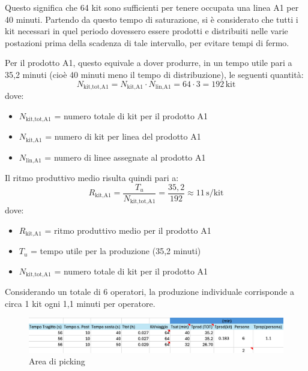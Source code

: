 \documentclass[11pt]{article}
\begin{document}
\noindent
Questo significa che 64 kit sono sufficienti per tenere occupata una linea A1 per 40 minuti. Partendo da questo tempo di saturazione, si è considerato che tutti i kit necessari in quel periodo dovessero essere prodotti e distribuiti nelle varie postazioni prima della scadenza di tale intervallo, per evitare tempi di fermo.

Per il prodotto A1, questo equivale a dover produrre, in un tempo utile pari a 35,2 minuti (cioè 40 minuti meno il tempo di distribuzione), le seguenti quantità:
\begin{equation}
    N_\text{kit,tot,A1} = N_\text{kit,A1} \cdot N_\text{lin,A1} = 64 \cdot 3 = 192 \, \text{kit}
\end{equation}
dove:
\begin{itemize}
    \item $N_\text{kit,tot,A1}$ = numero totale di kit per il prodotto A1
    \item $N_\text{kit,A1}$ = numero di kit per linea del prodotto A1
    \item $N_\text{lin,A1}$ = numero di linee assegnate al prodotto A1
\end{itemize}

\noindent
Il ritmo produttivo medio risulta quindi pari a:
\begin{equation}
    R_\text{kit,A1} = \frac{T_u}{N_\text{kit,tot,A1}} = \frac{35{,}2}{192} \approx 11 \, \text{s/kit}
\end{equation}
dove:
\begin{itemize}
    \item $R_\text{kit,A1}$ = ritmo produttivo medio per il prodotto A1
    \item $T_u$ = tempo utile per la produzione (35,2 minuti)
    \item $N_\text{kit,tot,A1}$ = numero totale di kit per il prodotto A1
\end{itemize}

Considerando un totale di 6 operatori, la produzione individuale corrisponde a circa 1 kit ogni 1,1 minuti per operatore.

\begin{figure}[H]
    \centering
    \includegraphics[width=\textwidth]{images/Picking.png}
    \caption{Area di picking}
    \label{fig: Area di picking}
\end{figure}
\end{document}
